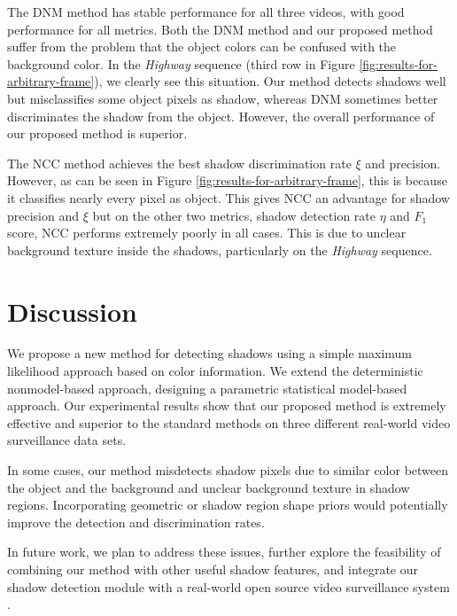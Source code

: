 The DNM method has stable performance for all three videos, with good
performance for all metrics. Both the DNM method and our proposed
method suffer from the problem that the object colors can be confused
with the background color.  In the \textit{Highway} sequence (third
row in Figure \ref{fig:results-for-arbitrary-frame}), we clearly see
this situation. Our method detects shadows well but misclassifies some
object pixels as shadow, whereas DNM sometimes better discriminates
the shadow from the object.  However, the overall performance of our
proposed method is superior.

The NCC method achieves the best shadow discrimination rate $\xi$ and
precision. However, as can be seen in
Figure \ref{fig:results-for-arbitrary-frame}, this is because it
classifies nearly every pixel as object.  This gives NCC an advantage
for shadow precision and $\xi$ but on the other two metrics, shadow
detection rate $\eta$ and $F_1$ score, NCC performs extremely poorly
in all cases.  This is due to unclear background texture inside the
shadows, particularly on the \textit{Highway} sequence.

\section{Discussion}
\label{sec:shadow-discussion}

We propose a new method for detecting shadows using a simple maximum
likelihood approach based on color information.  We extend the
deterministic nonmodel-based approach, designing a parametric
statistical model-based approach. Our experimental results show that
our proposed method is extremely effective and superior to the
standard methods on three different real-world video surveillance data
sets.

In some cases, our method misdetects shadow pixels due to similar
color between the object and the background and unclear background
texture in shadow regions. Incorporating geometric or shadow region
shape priors would potentially improve the detection and
discrimination rates.

In future work, we plan to address these issues, further explore the
feasibility of combining our method with other useful shadow features,
and integrate our shadow detection module with a real-world open
source video surveillance system .

\FloatBarrier



